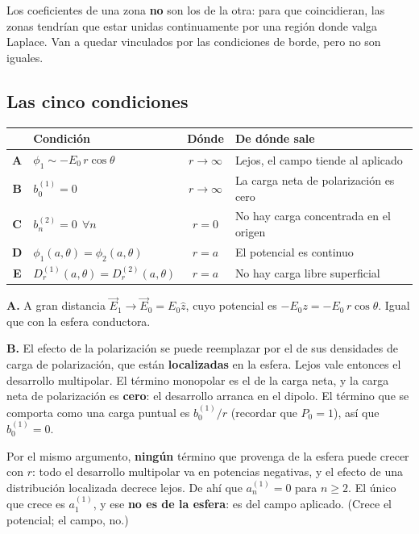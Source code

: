 \documentclass[12pt,a4paper]{article}
\begin{document}
\begin{notebox}
Los coeficientes de una zona \textbf{no} son los de la otra: para que
coincidieran, las zonas tendrían que estar unidas continuamente por una región
donde valga Laplace. Van a quedar vinculados por las condiciones de borde, pero no
son iguales.
\end{notebox}

\subsection{Las cinco condiciones}

\begin{table}[H]
  \centering
  \begin{tabularx}{\textwidth}{c l c X}
    \toprule
    & Condición & Dónde & De dónde sale \\
    \midrule
    \textbf{A} & $\phi_1 \sim -E_0\, r\cos\theta$ & $r\to\infty$ & Lejos, el campo tiende al aplicado \\
    \textbf{B} & $b_0^{(1)} = 0$ & $r\to\infty$ & La carga neta de polarización es cero \\
    \textbf{C} & $b_n^{(2)} = 0\ \ \forall n$ & $r = 0$ & No hay carga concentrada en el origen \\
    \textbf{D} & $\phi_1(a,\theta) = \phi_2(a,\theta)$ & $r = a$ & El potencial es continuo \\
    \textbf{E} & $D_{r}^{(1)}(a,\theta) = D_{r}^{(2)}(a,\theta)$ & $r = a$ & No hay carga libre superficial \\
    \bottomrule
  \end{tabularx}
\end{table}

\textbf{A.} A gran distancia $\vec E_1 \to \vec E_0 = E_0\hat z$, cuyo potencial
es $-E_0 z = -E_0\, r\cos\theta$. Igual que con la esfera conductora.

\textbf{B.} El efecto de la polarización se puede reemplazar por el de sus
densidades de carga de polarización, que están \textbf{localizadas} en la esfera.
Lejos vale entonces el desarrollo multipolar. El término monopolar es el de la
carga neta, y la carga neta de polarización es \textbf{cero}: el desarrollo
arranca en el dipolo. El término que se comporta como una carga puntual es
$b_0^{(1)}/r$ (recordar que $P_0 = 1$), así que $b_0^{(1)}=0$.

\begin{notebox}
Por el mismo argumento, \textbf{ningún} término que provenga de la esfera puede
crecer con $r$: todo el desarrollo multipolar va en potencias negativas, y el
efecto de una distribución localizada decrece lejos. De ahí que $a_n^{(1)} = 0$
para $n \ge 2$. El único que crece es $a_1^{(1)}$, y ese \textbf{no es de la
esfera}: es del campo aplicado. (Crece el potencial; el campo, no.)
\end{notebox}
\end{document}
